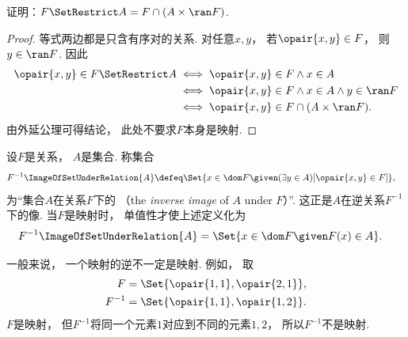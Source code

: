 \begin{example}
    证明：\(F \SetRestrict A = F \cap (A \times \ran F)\).
    \begin{proof}
        等式两边都是只含有序对的关系.
        对任意\(x,y\)，
        若\(\opair{x,y}\in F\)，
        则\(y\in\ran F\).
        因此
        \begin{align*}
            \opair{x,y}\in F\SetRestrict A
            &\iff\opair{x,y}\in F\land x\in A \\
            &\iff\opair{x,y}\in F\land x\in A\land y\in\ran F \\
            &\iff\opair{x,y}\in F\cap(A\times\ran F).
        \end{align*}
        由外延公理可得结论，
        此处不要求\(F\)本身是映射.
    \end{proof}
\end{example}

\begin{definition}
    设\(F\)是关系，
    \(A\)是集合.
    称集合
    \begin{align*}
        F^{-1}\ImageOfSetUnderRelation{A}
        &\defeq\Set{x\in\dom F\given(\exists y\in A)[\opair{x,y}\in F]},
    \end{align*}
    为“集合\(A\)在关系\(F\)下的%
    （the \emph{inverse image} of \(A\) under \(F\)）”.
    这正是\(A\)在逆关系\(F^{-1}\)下的像.
    当\(F\)是映射时，
    单值性才使上述定义化为
    \begin{align*}
        F^{-1}\ImageOfSetUnderRelation{A}
        &=\Set{x\in\dom F\given F(x)\in A}.
    \end{align*}
\end{definition}

一般来说，
一个映射的逆不一定是映射.
例如，
取
\begin{align*}
    F &=\Set{\opair{1,1},\opair{2,1}}, \\
    F^{-1} &=\Set{\opair{1,1},\opair{1,2}}.
\end{align*}
\(F\)是映射，
但\(F^{-1}\)将同一个元素\(1\)对应到不同的元素\(1,2\)，
所以\(F^{-1}\)不是映射.

